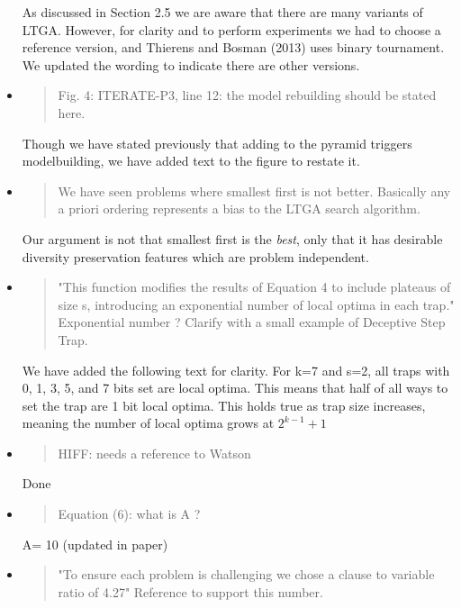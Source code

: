 \documentclass[]{article}
\begin{document}
\begin{itemize}
As discussed in Section 2.5 we are aware that there are many variants of LTGA. However, for clarity and to perform experiments we had to choose a reference version, and Thierens and Bosman (2013) uses binary tournament. We updated the wording to indicate there are other versions.

\item
\begin{quote}
Fig. 4: ITERATE-P3, line 12: the model rebuilding should be stated here.
\end{quote}

Though we have stated previously that adding to the pyramid triggers modelbuilding, we have added text to the figure to restate it.

\item
\begin{quote}
We have seen problems where smallest first is not better. Basically any a priori ordering represents a bias to the LTGA search algorithm.
\end{quote}

Our argument is not that smallest first is the \textit{best}, only that it has desirable diversity preservation features which are problem independent.

\item
\begin{quote}
 "This function modifies the results of Equation 4 to include plateaus of size s, introducing an exponential number of local optima in each trap."
Exponential number ? Clarify with a small example of Deceptive Step Trap.
\end{quote}

We have added the following text for clarity. 
For k=7 and s=2, all traps with 0, 1, 3, 5, and 7 bits set are local optima. This means that half of all ways to set the trap are 1 bit local optima. This holds true as trap size increases, meaning the number of local optima grows at $2^{k-1}+1$

\item
\begin{quote}
HIFF: needs a reference to Watson
\end{quote}

Done

\item
\begin{quote}
Equation (6): what is A ?
\end{quote}

A= 10 (updated in paper)

\item
\begin{quote}
"To ensure each problem is challenging we chose a clause to variable ratio of 4.27"
Reference to support this number.
\end{quote}


\end{itemize}
\end{document}
